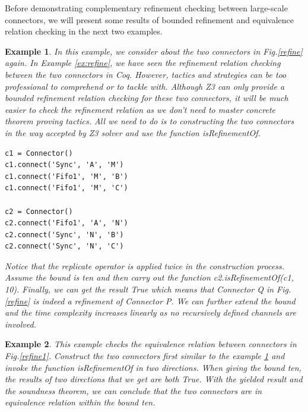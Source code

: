 \documentclass[3p,times]{elsarticle}
\newtheorem{example}{Example}[section]
\begin{document}
Before demonstrating complementary refinement checking between large-scale connectors, we will present some results of bounded refinement and equivalence relation checking in the next two examples.
\begin{example}
\label{ex:equivalence1}
In this example, we consider about the two connectors in Fig.\ref{refine} again. In  Example \ref{ex:refine}, we have seen the refinement relation checking between the two connectors in Coq. However, tactics and strategies can be too professional to comprehend or to tackle with. Although Z3 can only provide a bounded refinement relation checking for these two connectors, it will be much easier to check the refinement relation as we don't need to master concrete theorem proving tactics. All we need to do is to constructing the two connectors in the way accepted by Z3 solver and use the function \emph{isRefinementOf}.
\begin{lstlisting}[frame=single]
c1 = Connector()
c1.connect('Sync', 'A', 'M')
c1.connect('Fifo1', 'M', 'B')
c1.connect('Fifo1', 'M', 'C')

c2 = Connector()
c2.connect('Fifo1', 'A', 'N')
c2.connect('Sync', 'N', 'B')
c2.connect('Sync', 'N', 'C')
\end{lstlisting}
Notice that the \emph{replicate} operator is applied twice in the construction process. Assume the bound is ten and then carry out the function \emph{c2.isRefinementOf(c1, 10)}. Finally, we can get the result \emph{True} which means that \emph{Connector Q} in Fig.\ref{refine} is indeed a refinement of \emph{Connector P}. We can further extend the bound and the time complexity increases linearly as no recursively defined channels are involved.
\end{example}
\begin{example}
This example checks the equivalence relation between connectors in Fig.\ref{refine1}. Construct the two connectors first similar to the example \ref{ex:equivalence1} and invoke the function \emph{isRefinementOf} in two directions. 
When giving the bound ten, the results of two directions that we get are both \emph{True}. With the yielded result and the soundness theorem, we can conclude that the two connectors are in equivalence relation within the bound ten.
\end{example}
\end{document}
